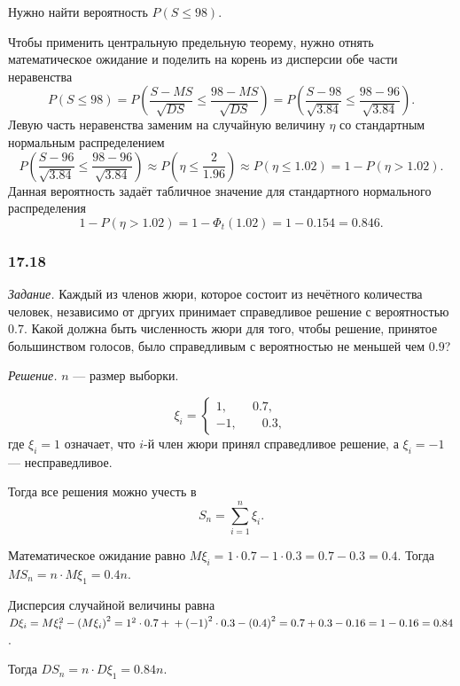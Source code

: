 Нужно найти вероятность $P \left( S \leq 98 \right)$.

Чтобы применить центральную предельную теорему,
нужно отнять математическое ожидание и поделить на корень из дисперсии обе части неравенства
$$P \left( S \leq 98 \right) =
  P \left( \frac{S - MS}{ \sqrt{DS}} \leq \frac{98 - MS}{ \sqrt{DS}} \right) =
  P \left( \frac{S - 98}{ \sqrt{3.84}} \leq \frac{98 - 96}{ \sqrt{3.84}} \right).$$
Левую часть неравенства заменим на случайную величину $ \eta $
со стандартным нормальным распределением
$$P \left( \frac{S - 96}{ \sqrt{3.84}} \leq \frac{98 - 96}{ \sqrt{3.84}} \right) \approx
  P \left( \eta \leq \frac{2}{1.96} \right) \approx
  P \left( \eta \leq 1.02 \right) =
  1 - P \left( \eta > 1.02 \right).$$
Данная вероятность задаёт табличное значение для стандартного нормального распределения
$$1 - P \left( \eta > 1.02 \right) =
  1 - \Phi_t \left( 1.02 \right) =
  1 - 0.154 =
  0.846.$$

\subsubsection*{17.18}

\textit{Задание.} Каждый из членов жюри, которое состоит из нечётного количества человек,
независимо от дргуих принимает справедливое решение с вероятностью $0.7$.
Какой должна быть численность жюри для того, чтобы решение, принятое большинством голосов,
было справедливым с вероятностью не меньшей чем $0.9$?

\textit{Решение.} $n$ --- размер выборки.

$$ \xi_i =
  \begin{cases}
    1, \qquad 0.7, \\
    -1, \qquad 0.3,
  \end{cases}$$
где $ \xi_i = 1$ означает, что $i$-й член жюри принял справедливое решение,
а $ \xi_i = -1$ --- несправедливое.

Тогда все решения можно учесть в
$$S_n =
  \sum \limits_{i = 1}^n \xi_i.$$

Математическое ожидание равно $M \xi_i = 1 \cdot 0.7 -1 \cdot 0.3 = 0.7 - 0.3 = 0.4$.
Тогда $MS_n = n \cdot M \xi_1 = 0.4n$.

Дисперсия случайной величины равна
$D \xi_i =
  M \xi_i^2 - \left( M \xi_i \right)^2 =
  1^2 \cdot 0.7 + \\
  + \left( -1 \right)^2 \cdot 0.3 - \left( 0.4 \right)^2 =
  0.7 + 0.3 - 0.16 =
  1 - 0.16 =
  0.84$.

Тогда $DS_n = n \cdot D \xi_1 = 0.84n$.


